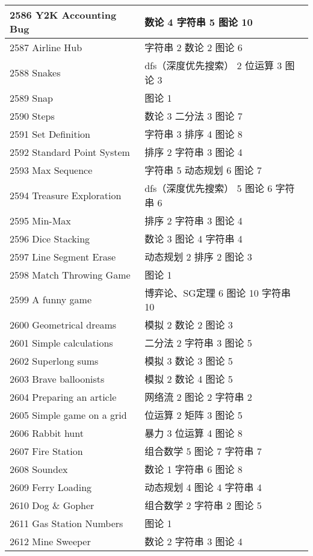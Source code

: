 \begin{longtable}{| p{} | p{} |}
 2586 Y2K Accounting Bug  & 数论 4 字符串 5 图论 10 \\ \hline
 2587 Airline Hub  & 字符串 2 数论 2 图论 6 \\ \hline
 2588 Snakes  & dfs（深度优先搜索） 2 位运算 3 图论 3 \\ \hline
 2589 Snap  & 图论 1 \\ \hline
 2590 Steps  & 数论 3 二分法 3 图论 7 \\ \hline
 2591 Set Definition  & 字符串 3 排序 4 图论 8 \\ \hline
 2592 Standard Point System  & 排序 2 字符串 3 图论 4 \\ \hline
 2593 Max Sequence  & 字符串 5 动态规划 6 图论 7 \\ \hline
 2594 Treasure Exploration  & dfs（深度优先搜索） 5 图论 6 字符串 6 \\ \hline
 2595 Min-Max  & 排序 2 字符串 3 图论 4 \\ \hline
 2596 Dice Stacking  & 数论 3 图论 4 字符串 4 \\ \hline
 2597 Line Segment Erase  & 动态规划 2 排序 2 图论 3 \\ \hline
 2598 Match Throwing Game  & 图论 1 \\ \hline
 2599 A funny game  & 博弈论、SG定理 6 图论 10 字符串 10 \\ \hline
 2600 Geometrical dreams  & 模拟 2 数论 2 图论 3 \\ \hline
 2601 Simple calculations  & 二分法 2 字符串 3 图论 5 \\ \hline
 2602 Superlong sums  & 模拟 3 数论 3 图论 5 \\ \hline
 2603 Brave balloonists  & 模拟 2 数论 4 图论 5 \\ \hline
 2604 Preparing an article  & 网络流 2 图论 2 字符串 2 \\ \hline
 2605 Simple game on a grid  & 位运算 2 矩阵 3 图论 5 \\ \hline
 2606 Rabbit hunt  & 暴力 3 位运算 4 图论 8 \\ \hline
 2607 Fire Station  & 组合数学 5 图论 7 字符串 7 \\ \hline
 2608 Soundex  & 数论 1 字符串 6 图论 8 \\ \hline
 2609 Ferry Loading  & 动态规划 4 图论 4 字符串 4 \\ \hline
 2610 Dog \& Gopher  & 组合数学 2 字符串 2 图论 5 \\ \hline
 2611 Gas Station Numbers  & 图论 1 \\ \hline
 2612 Mine Sweeper  & 数论 2 字符串 3 图论 4 \\ \hline

\end{longtable}
